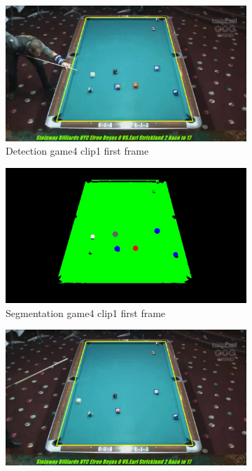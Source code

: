 \begin{figure}[H]
    \centering
    \begin{subfigure}[b]{0.35\textwidth}
        \centering
        \includegraphics[width=\textwidth]{images/Detection/game4_clip1_detected_balls_first_frame.jpg}
        \caption{Detection game4 clip1 first frame}
        \label{fig: game4_clip1_first_frame_detected}
    \end{subfigure}
    \begin{subfigure}[b]{0.35\textwidth}
        \centering
        \includegraphics[width=\textwidth]{images/Segmentation/game4_clip1_segmented_balls_first_frame.jpg}
        \caption{Segmentation game4 clip1 first frame}
		\label{fig: game4_clip1_first_frame_segmented}
    \end{subfigure}
    \begin{subfigure}[b]{0.35\textwidth}
        \centering
        \includegraphics[width=\textwidth]{images/Detection/game4_clip1_detected_balls_last_frame.jpg}

\end{subfigure}
\end{figure}
